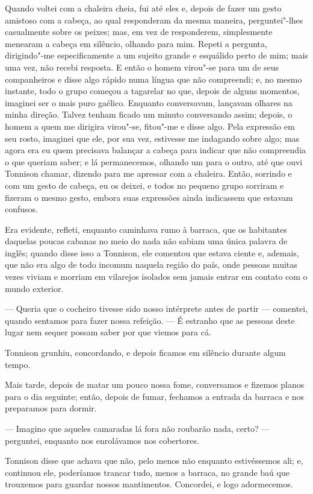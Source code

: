 Quando voltei com a chaleira cheia, fui até eles e, depois de fazer um gesto amistoso com a cabeça, ao qual responderam
da mesma maneira, perguntei"-lhes casualmente sobre os peixes; mas, em vez de responderem, simplesmente menearam a
cabeça em silêncio, olhando para mim. Repeti a pergunta, dirigindo"-me especificamente a um sujeito grande e esquálido
perto de mim; mais uma vez, não recebi resposta. E então o homem virou"-se para um de seus companheiros e disse algo
rápido numa língua que não compreendi; e, no mesmo instante, todo o grupo começou a tagarelar no que, depois de alguns
momentos,	 imaginei ser o mais puro gaélico. Enquanto conversavam, lançavam olhares na minha direção. Talvez tenham
ficado um minuto conversando assim; depois, o homem a quem me dirigira virou"-se, fitou"-me e disse algo. Pela expressão
em seu rosto, imaginei que ele, por sua vez, estivesse me indagando sobre algo; mas agora era eu quem precisava
balançar a cabeça para indicar que não compreendia o que queriam saber; e lá permanecemos, olhando um para o outro, até
que ouvi Tonnison chamar, dizendo para me apressar com a chaleira. Então, sorrindo e com um gesto de cabeça, eu os
deixei, e todos no pequeno grupo sorriram e fizeram o mesmo gesto, embora suas expressões ainda indicassem que estavam
confusos.

Era evidente, refleti, enquanto caminhava rumo à barraca, que os habitantes daquelas poucas cabanas no meio do nada não
sabiam uma única palavra de inglês; quando disse isso a Tonnison, ele comentou que estava ciente e, ademais, que não
era algo de todo incomum naquela região do país, onde pessoas muitas vezes viviam e morriam em vilarejos isolados sem
jamais entrar em contato com o mundo exterior.

--- Queria que o cocheiro tivesse sido nosso intérprete antes de partir --- comentei, quando sentamos para fazer nossa
refeição. --- É estranho que as pessoas deste lugar nem sequer possam saber por que viemos para cá.

Tonnison grunhiu, concordando, e depois ficamos em silêncio durante algum tempo.

Mais tarde, depois de matar um pouco nossa fome, conversamos e fizemos planos para o dia seguinte; então, depois de
fumar, fechamos a entrada da barraca e nos preparamos para dormir. 

--- Imagino que aqueles camaradas lá fora não roubarão nada, certo? --- perguntei, enquanto nos enrolávamos nos cobertores.

Tonnison disse que achava que não, pelo menos não enquanto estivéssemos ali; e, continuou ele, poderíamos trancar tudo,
menos a barraca, no grande baú que trouxemos para guardar nossos mantimentos. Concordei, e logo adormecemos.

